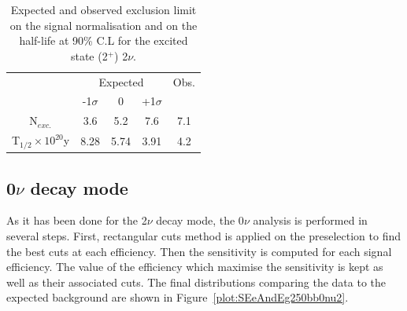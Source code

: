 \documentclass[main.tex]{subfiles}
\begin{document}
\begin{table}
\centering
\begin{tabular}{c|c|c|c||c}
 & \multicolumn{3}{c||}{Expected} & Obs. \\
                                                & -1$\sigma$ & 0        & +1$\sigma$ &      \\[0.2cm]
\hline
N$_{exc.}$                                          & 3.6        & 5.2      & 7.6        & 7.1      \\[0.2cm]
T$_{\text{1/2}} \times \text{10}^{\text{20}}$y  & 8.28       & 5.74     & 3.91       & 4.2      \\[0.2cm]
\hline
\end{tabular}
\caption{Expected and observed exclusion limit on the signal normalisation and on the half-life at 90\% C.L for the excited state (2$^+$) 2$\nu$.}
\label{Tab:FinalResultsbb2nu2}
\end{table}


\FloatBarrier


\subsection{0$\nu$ decay mode}\label{sec:AnalysisResult2PLUS0nu}


\NI As it has been done for the 2$\nu$ decay mode, the 0$\nu$ analysis is performed in several steps. First, rectangular cuts method is applied on the preselection to find the best cuts at each efficiency. Then the sensitivity is computed for each signal efficiency. The value of the efficiency which maximise the sensitivity is kept as well as their associated cuts. The final distributions comparing the data to the expected background are shown in Figure~\ref{plot:SEeAndEg250bb0nu2}.
\end{document}
